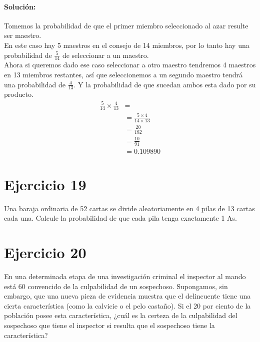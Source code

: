\documentclass[12pt]{article}
\begin{document}
\paragraph{Solución: } Tomemos la probabilidad de que el primer miembro seleccionado al azar resulte ser maestro.\\
En este caso hay 5 maestros en el consejo de 14 miembros, por lo tanto hay una probabilidad de $\frac{5}{14}$ de seleccionar a un maestro.\\
Ahora si queremos dado ese caso seleccionar a otro maestro tendremos 4 maestros en 13 miembros restantes, así que seleccionemos a un segundo maestro tendrá una probabilidad de $\frac{4}{13}$.
Y la probabilidad de que sucedan ambos esta dado por su producto.\\
\begin{equation}
	\begin{split}
	\frac{5}{14} \times \frac{4}{13}&=\\
	&=\frac{5\times 4}{14 \times 13} \\
	&=\frac{20}{182} \\
	&=\frac{10}{91}\\
	&= 0.109890
	\end{split}
\end{equation}
\section{Ejercicio 19}
Una baraja ordinaria de 52 cartas se divide aleatoriamente en 4 pilas de 13 cartas cada una.
Calcule la probabilidad de que cada pila tenga exactamente 1 As.
\section{Ejercicio 20}
 En una determinada etapa de una investigación criminal el inspector al mando está 60 %
convencido de la culpabilidad de un sospechoso. Supongamos, sin embargo, que una nueva
pieza de evidencia muestra que el delincuente tiene una cierta característica (como la calvicie
o el pelo castaño). Si el 20 por ciento de la población posee esta característica, ¿cuál es la
certeza de la culpabilidad del sospechoso que tiene el inspector si resulta que el sospechoso
tiene la característica?
\end{document}
